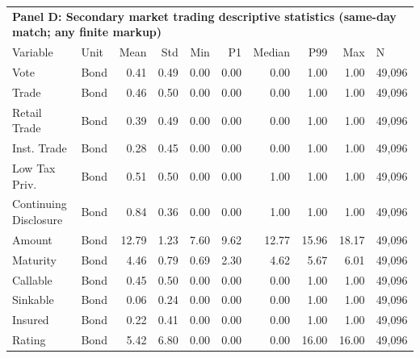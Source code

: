 \begin{table}[H]
\centering
\begin{tabular*}{\textwidth}{@{\extracolsep{\fill}}llrrrrrrrl}
\multicolumn{10}{l}{\textbf{Panel D: Secondary market trading descriptive statistics (same-day match; any finite markup)}}\\

\addlinespace
  \toprule
Variable & Unit & Mean & Std & Min & P1 & Median & P99 & Max & N \\ 
  \hline
Vote & Bond & 0.41 & 0.49 & 0.00 & 0.00 & 0.00 & 1.00 & 1.00 & 49,096 \\ 
  Trade & Bond & 0.46 & 0.50 & 0.00 & 0.00 & 0.00 & 1.00 & 1.00 & 49,096 \\ 
  Retail Trade & Bond & 0.39 & 0.49 & 0.00 & 0.00 & 0.00 & 1.00 & 1.00 & 49,096 \\ 
  Inst. Trade & Bond & 0.28 & 0.45 & 0.00 & 0.00 & 0.00 & 1.00 & 1.00 & 49,096 \\ 
  Low Tax Priv. & Bond & 0.51 & 0.50 & 0.00 & 0.00 & 1.00 & 1.00 & 1.00 & 49,096 \\ 
  Continuing Disclosure & Bond & 0.84 & 0.36 & 0.00 & 0.00 & 1.00 & 1.00 & 1.00 & 49,096 \\ 
  Amount & Bond & 12.79 & 1.23 & 7.60 & 9.62 & 12.77 & 15.96 & 18.17 & 49,096 \\ 
  Maturity & Bond & 4.46 & 0.79 & 0.69 & 2.30 & 4.62 & 5.67 & 6.01 & 49,096 \\ 
  Callable & Bond & 0.45 & 0.50 & 0.00 & 0.00 & 0.00 & 1.00 & 1.00 & 49,096 \\ 
  Sinkable & Bond & 0.06 & 0.24 & 0.00 & 0.00 & 0.00 & 1.00 & 1.00 & 49,096 \\ 
  Insured & Bond & 0.22 & 0.41 & 0.00 & 0.00 & 0.00 & 1.00 & 1.00 & 49,096 \\ 
  Rating & Bond & 5.42 & 6.80 & 0.00 & 0.00 & 0.00 & 16.00 & 16.00 & 49,096 \\ 
   \hline
\end{tabular*}
\end{table}
